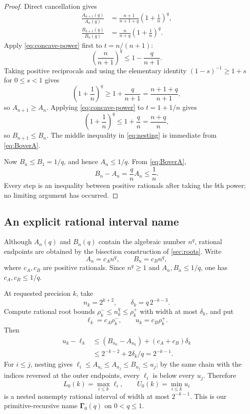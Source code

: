 \documentclass[11pt]{article}
\newcommand{\Gam}{\boldsymbol\Gamma}
\begin{document}
\begin{proof}
Direct cancellation gives
\begin{align*}
 \frac{A_{n+1}(q)}{A_n(q)}
 &=\frac{n+1}{n+1+q}\left(1+\frac1n\right)^q,\\
 \frac{B_{n+1}(q)}{B_n(q)}
 &=\frac{n}{n+q}\left(1+\frac1n\right)^q.
\end{align*}
Apply \eqref{eq:concave-power} first to $t=n/(n+1)$:
\[
 \left(\frac n{n+1}\right)^q\le1-\frac q{n+1}.
\]
Taking positive reciprocals and using the elementary identity
$(1-s)^{-1}\ge1+s$ for $0\le s<1$ gives
\[
 \left(1+\frac1n\right)^q
 \ge1+\frac q{n+1}=\frac{n+1+q}{n+1},
\]
so $A_{n+1}\ge A_n$.  Applying \eqref{eq:concave-power} to
$t=1+1/n$ gives
\[
 \left(1+\frac1n\right)^q\le1+\frac qn=\frac{n+q}{n},
\]
so $B_{n+1}\le B_n$.  The middle inequality in \eqref{eq:nesting} is
immediate from \eqref{eq:BoverA}.

Now $B_n\le B_1=1/q$, and hence $A_n\le1/q$.  From
\eqref{eq:BoverA},
\[
 B_n-A_n=\frac qn A_n\le\frac1n.
\]
Every step is an inequality between positive rationals after taking the
$b$th power; no limiting argument has occurred.
\end{proof}

\subsection{An explicit rational interval name}

Although $A_n(q)$ and $B_n(q)$ contain the algebraic number $n^q$, rational
endpoints are obtained by the bisection construction of \cref{sec:roots}.
Write
\[
 A_n=c_A n^q,\qquad B_n=c_B n^q,
\]
where $c_A,c_B$ are positive rationals.  Since $n^q\ge1$ and
$A_n,B_n\le1/q$, one has $c_A,c_B\le1/q$.

At requested precision $k$, take
\[
 n_k=2^{k+2},\qquad
 \delta_k=q\,2^{-k-3}.
\]
Compute rational root bounds $\rho_k^-\le n_k^q\le\rho_k^+$ with width at
most $\delta_k$, and put
\[
 \ell_k=c_A\rho_k^-,\qquad u_k=c_B\rho_k^+.
\]
Then
\begin{align*}
 u_k-\ell_k
 &\le (B_{n_k}-A_{n_k})+(c_A+c_B)\delta_k\\
 &\le2^{-k-2}+2\delta_k/q
 =2^{-k-1}.
 \label{eq:raw-width}
\end{align*}
For $i\le j$, nesting gives
$\ell_i\le A_{n_i}\le A_{n_j}\le B_{n_j}\le u_j$; by the same chain with
the indices reversed at the outer endpoints, every $\ell_i$ is below every
$u_j$.  Therefore
\[
 L_0(k)=\max_{i\le k}\ell_i,
 \qquad U_0(k)=\min_{i\le k}u_i
 \label{eq:strip-name}
\]
is a nested nonempty rational interval of width at most $2^{-k-1}$.  This is
our primitive-recursive name $\Gam_0(q)$ on $0<q\le1$.
\end{document}
